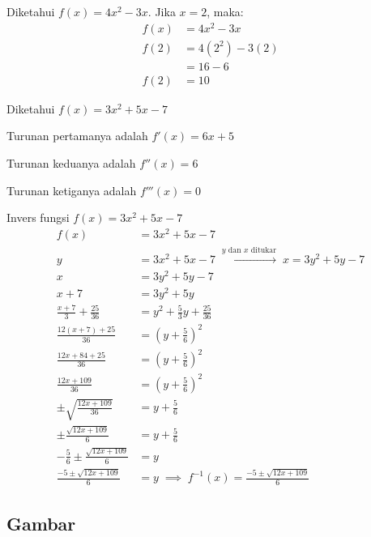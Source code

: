 \begin{essaylist}
    \item Diketahui $f(x) = 4x^2 - 3x$. Jika $x = 2$, maka:
    \begin{align*}
        f(x) &= 4x^2 - 3x \\
        f(2) &= 4(2^2) - 3(2) \\
        &= 16 - 6 \\
        f(2) &= 10
    \end{align*}
    
    \item Diketahui $\displaystyle f(x) = 3x^2 + 5x - 7$
    \begin{essaylist}
        \item Turunan pertamanya adalah $f'(x) = 6x + 5$
        \item Turunan keduanya adalah $f''(x) = 6$
        \item Turunan ketiganya adalah $f'''(x) = 0$
    \end{essaylist}
    \item Invers fungsi $f(x) = 3x^2 + 5x - 7$
    \begin{align*}
        f(x) &= 3x^2 + 5x - 7 \\
        y &= 3x^2 + 5x - 7 \; \xrightarrow{y \text{ dan } x \text{ ditukar}} \; x = 3y^2 + 5y - 7 \\
        x &= 3y^2 + 5y - 7 \\
        x + 7 &= 3y^2 + 5y \\
        \frac{x + 7}{3} + \frac{25}{36} &= y^2 + \frac{5}{3}y + \frac{25}{36} \\
        \frac{12(x + 7) + 25}{36} &= \left(y + \frac{5}{6}\right)^2 \\
        \frac{12x + 84 + 25}{36} &= \left(y + \frac{5}{6}\right)^2 \\
        \frac{12x + 109}{36} &= \left(y + \frac{5}{6}\right)^2 \\
        \pm\sqrt{\frac{12x + 109}{36}} &= y + \frac{5}{6} \\
        \pm\frac{\sqrt{12x + 109}}{6} &= y + \frac{5}{6} \\
        -\frac{5}{6} \pm \frac{\sqrt{12x + 109}}{6} &= y \\
        \frac{-5 \pm \sqrt{12x + 109}}{6} &= y \; \implies \; \boxed{f^{-1}(x) = \frac{-5 \pm \sqrt{12x + 109}}{6}}
    \end{align*}
\end{essaylist}

\subsection{Gambar}

